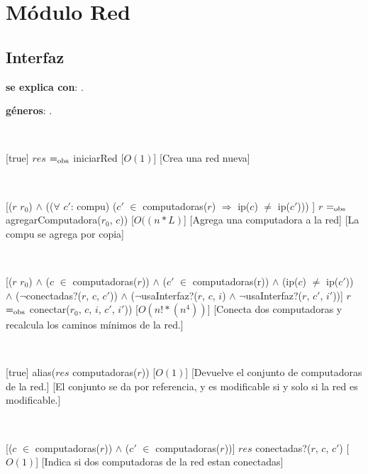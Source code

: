 \section{Módulo Red}

\subsection{Interfaz}

\textbf{se explica con}: .

\textbf{géneros}: .

  ~

  [true]
  {$res$ $=_{\mathrm{obs}}$ iniciarRed}
  [$O(1)$]
  [Crea una red nueva]


  ~

  [($r$ \igobs $r_0$) $\land$ (($\forall$ $c'$: compu) ($c'$ $\in$ computadoras($r$) $\Rightarrow$  ip($c$) $\neq$  ip($c'$)))  ]
  {$r$ $=_{\mathrm{obs}}$ agregarComputadora($r_0$, $c$)) }
  [$O((n*L)$]
  [Agrega una computadora a la red]
  [La compu se agrega por copia]

  ~

  [($r$ \igobs $r_0$) $\land$ ($c$ $\in$ computadoras($r$)) $\land$ ($c'$ $\in$ computadoras(r)) $\land$ (ip($c$) $\neq$ ip($c'$)) \\
   $\land$ ($\neg$conectadas?($r$, $c$, $c'$)) $\land$ ($\neg$usaInterfaz?($r$, $c$, $i$) $\land$ $\neg$usaInterfaz?($r$, $c'$, $i'$))]
  {$r$ $=_{\mathrm{obs}}$ conectar($r_0$, $c$, $i$, $c'$, $i'$))}
  [$O(n!*(n^4))$]
  [Conecta dos computadoras y recalcula los caminos mínimos de la red.]

  ~


  [true]
  {alias($res$ \igobs computadoras($r$))}
  [$O(1)$]
  [Devuelve el conjunto de computadoras de la red.]
  [El conjunto se da por referencia, y es modificable si y solo si la red es modificable.]

  ~

  [($c$ $\in$ computadoras($r$)) $\land$ ($c'$ $\in$ computadoras($r$))]
  {$res$ \igobs conectadas?($r$, $c$, $c'$)}
  [$O(1)$]
  [Indica si dos computadoras de la red estan conectadas]

  ~

